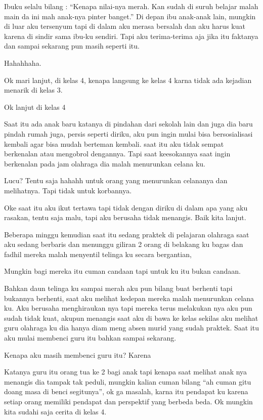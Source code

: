 Ibuku selalu bilang : ``Kenapa nilai-nya merah. Kan sudah di suruh belajar malah main da ini mah anak-nya pinter banget.'' Di depan ibu anak-anak lain, mungkin di luar aku tersenyum tapi di dalam aku merasa bersalah dan aku harus kuat karena di sindir sama ibu-ku sendiri. Tapi aku terima-terima aja jika itu faktanya dan sampai sekarang pun masih seperti itu.


Hahahhaha.


Ok mari lanjut, di kelas 4, kenapa langsung ke kelas 4 karna tidak ada kejadian menarik di kelas 3.


Ok lanjut di kelas 4


Saat itu ada anak baru katanya di pindahan dari sekolah lain dan juga dia baru pindah rumah juga, persis seperti diriku, aku pun ingin mulai bisa bersosialisasi kembali agar bisa mudah berteman kembali. saat itu aku tidak sempat berkenalan atau mengobrol dengannya. Tapi saat keesokannya saat ingin berkenalan pada jam olahraga dia malah menurunkan celana ku.


Lucu? Tentu saja hahahh untuk orang yang menurunkan celananya dan melihatnya. Tapi tidak untuk korbannya.


Oke saat itu aku ikut tertawa tapi tidak dengan diriku di dalam apa yang aku rasakan, tentu saja malu, tapi aku berusaha tidak menangis. Baik kita lanjut.


Beberapa minggu kemudian saat itu sedang praktek di pelajaran olahraga saat aku sedang berbaris dan menunggu giliran 2 orang di belakang ku bagas dan fadhil mereka malah menyentil telinga ku secara bergantian,


Mungkin bagi mereka itu cuman candaan tapi untuk ku itu bukan candaan.


Bahkan daun telinga ku sampai merah aku pun bilang buat berhenti tapi bukannya berhenti, saat aku melihat kedepan mereka malah menurunkan celana ku. Aku berusaha menghiraukan nya tapi mereka terus melakukan nya aku pun sudah tidak kuat, akupun menangis saat aku di bawa ke kelas sekilas aku melihat guru olahraga ku dia hanya diam meng absen murid yang sudah praktek. Saat itu aku mulai membenci guru itu bahkan sampai sekarang.


Kenapa aku masih membenci guru itu? Karena


Katanya guru itu orang tua ke 2 bagi anak tapi kenapa saat melihat anak nya menangis dia tampak tak peduli, mungkin kalian cuman bilang ``ah cuman gitu doang masa di benci segitunya'', ok ga masalah, karna itu pendapat ku karena setiap orang memiliki pendapat dan perspektif yang berbeda beda. Ok mungkin kita sudahi saja cerita di kelas 4.


